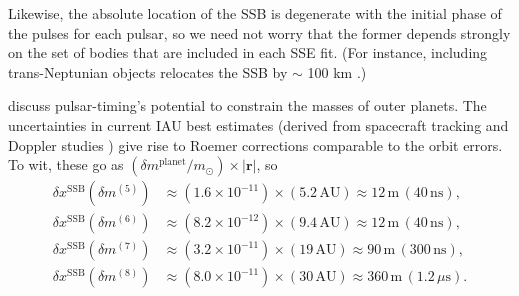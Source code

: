 \documentclass[reprint,
 amsmath,amssymb,
 aps,prd,floatfix,
]{revtex4-1}
\begin{document}
Likewise, the absolute location of the SSB is degenerate with the initial phase of the pulses for each pulsar, so we need not worry that the former depends strongly on the set of bodies that are included in each SSE fit. (For instance, including trans-Neptunian objects relocates the SSB by $\sim$ 100 km \cite{2014IPNPR.196C...1F}.)

\citet{2010ApJ...720L.201C} discuss pulsar-timing's potential to constrain the masses of outer planets. The uncertainties in current IAU best estimates (derived from spacecraft tracking and Doppler studies \cite{iaumasses,jh+2000,2006AJ....132.2520J,2014AJ....148...76J,2009AJ....137.4322J}) give rise to Roemer corrections comparable to the orbit errors. To wit, these go as $(\delta m^\mathrm{planet}/m_\mathrm{\odot}) \times |\mathbf{r}|$, so
%
\begin{equation}
    \begin{aligned}
    \delta x^\mathrm{SSB}(\delta m^{(5)}) & \approx (1.6 \!\times\! 10^{-11})\!\times\!
    (5.2 \, \mathrm{AU})
    \approx 12 \, \mathrm{m} \, (40 \, \mathrm{ns}), \\
    \delta x^\mathrm{SSB}(\delta m^{(6)}) & \approx (8.2 \!\times\! 10^{-12}) \!\times\!
    (9.4 \, \mathrm{AU})
    \approx 12 \, \mathrm{m} \, (40 \, \mathrm{ns}), \\
    \delta x^\mathrm{SSB}(\delta m^{(7)}) & \approx (3.2 \!\times\! 10^{-11}) \!\times\!
    (19 \, \mathrm{AU})
    \approx 90 \, \mathrm{m} \, (300 \, \mathrm{ns}), \\
    \delta x^\mathrm{SSB}(\delta m^{(8)}) & \approx (8.0 \!\times\! 10^{-11}) \!\times\!
    (30 \, \mathrm{AU})
    \approx 360 \, \mathrm{m} \,
    (1.2 \, \mu\mathrm{s}).
    \end{aligned}
\end{equation}
\end{document}
